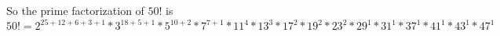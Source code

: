 \documentclass[10pt, AMS Euler]{article}
\begin{document}
\begin{enumerate}
\begin{center}
\begin{tabular}{l|cccccc}
                \end{tabular}
            \end{center}

            So the prime factorization of $50!$ is 
            $$ 50! = 2^{25+12+6+3+1} * 3^{18+5+1} * 5^{10+2} * 7^{7+1} * 11^{4} * 13^{3} * 17^{2} * 19^{2} * 23^{2} * 29^{1} * 31^{1} * 37^{1} * 41^{1} * 43^{1} * 47^{1} $$
  
	\end{enumerate}
	
	\noindent \underline{\hspace{3in}}\\
	
	
	
	
\end{document}
